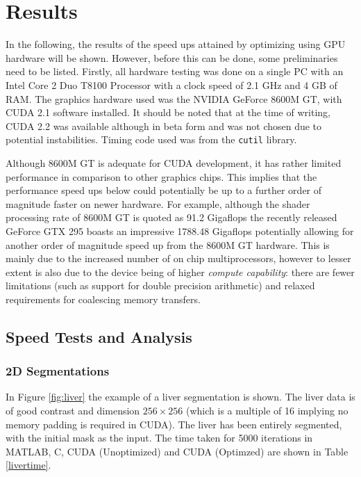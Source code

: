 \chapter{Results}

In the following, the results of the speed ups attained by optimizing using GPU hardware will be shown. However, before this can be done, some preliminaries need to be listed. Firstly, all hardware testing was done on a single PC with an Intel Core 2 Duo T8100 Processor with a clock speed of 2.1 GHz and 4 GB of RAM. The graphics hardware used was the NVIDIA GeForce 8600M GT, with CUDA 2.1 software installed. It should be noted that at the time of writing, CUDA 2.2 was available although in beta form and was not chosen due to potential instabilities. Timing code used was from the \texttt{cutil} library.

Although 8600M GT is adequate for CUDA development, it has rather limited performance in comparison to other graphics chips. This implies that the performance speed ups below could potentially be up to a further order of magnitude faster on newer hardware. For example, although the shader processing rate of 8600M GT is quoted as 91.2 Gigaflops the recently released GeForce GTX 295 boasts an impressive 1788.48 Gigaflops potentially allowing for another order of magnitude speed up from the 8600M GT hardware. This is mainly due to the increased number of on chip multiprocessors, however to lesser extent is also due to the device being of higher \textit{compute capability}: there are fewer limitations (such as support for double precision arithmetic) and relaxed requirements for coalescing memory transfers.

\section{Speed Tests and Analysis}\label{results}

\subsection{2D Segmentations}


In Figure \ref{fig:liver} the example of a liver segmentation is shown. The liver data is of good contrast and dimension $256\times 256$ (which is a multiple of 16 implying no memory padding is required in CUDA). The liver has been entirely segmented, with the initial mask as the input. The time taken for 5000 iterations in MATLAB, C, CUDA (Unoptimized) and CUDA (Optimzed) are shown in Table \ref{livertime}.

